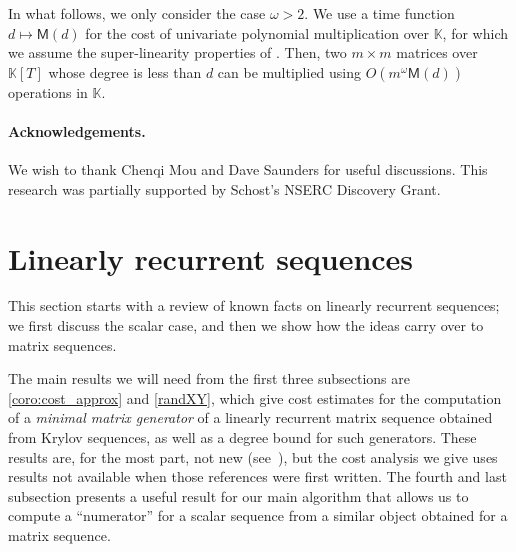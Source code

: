 \documentclass[12pt]{article}
\def\M {\ensuremath{\mathsf{M}}}
\def\K{\mathbb{K}}
\def\K {\ensuremath{\mathbb{K}}}
\begin{document}
In what follows, we only consider the case $\omega>2$.  We use a time
function $d \mapsto \M(d)$ for the cost of univariate polynomial
multiplication over $\K$, for which we assume the super-linearity
properties of \cite[Section~8.4]{GaGe13}.  Then, two $m\times m$
matrices over $\K[T]$ whose degree is less than $d$ can be multiplied
using $O(m^\omega \M(d))$ operations in $\K$.


\paragraph{Acknowledgements.} We wish to thank Chenqi Mou and Dave Saunders for useful
discussions. This research was partially supported by Schost's NSERC
Discovery Grant.


\section{Linearly recurrent sequences}

This section starts with a review of known facts on linearly recurrent
sequences; we first discuss the scalar case, and then we show how the ideas
carry over to matrix sequences. 

The main results we will need from the first three subsections are
\cref{coro:cost_approx} and \cref{randXY}, which give cost estimates for the
computation of a {\em minimal matrix generator} of a linearly recurrent matrix
sequence obtained from Krylov sequences, as well as a degree bound for such
generators. These results are, for the most part, not new
(see~\cite{Villard97,Villard97a,KalVil01,Turner02}), but the cost analysis we
give uses results not available when those references were first written.  The
fourth and last subsection presents a useful result for our main algorithm
that allows us to compute a ``numerator'' for a scalar sequence from a similar
object obtained for a matrix sequence.

\end{document}
